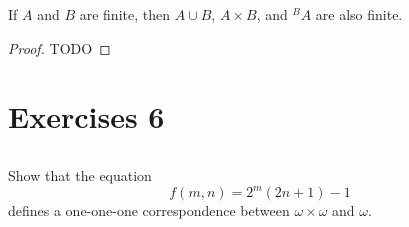 \documentclass{report}
\begin{document}
  If $A$ and $B$ are finite, then $A \cup B$, $A \times B$, and $^B{A}$ are also
    finite.

  \begin{proof}
    TODO
  \end{proof}

\section{Exercises 6}%

\subsection{}%

  Show that the equation $$f(m, n) = 2^m(2n + 1) - 1$$ defines a one-one-one
    correspondence between $\omega \times \omega$ and $\omega$.
\end{document}
